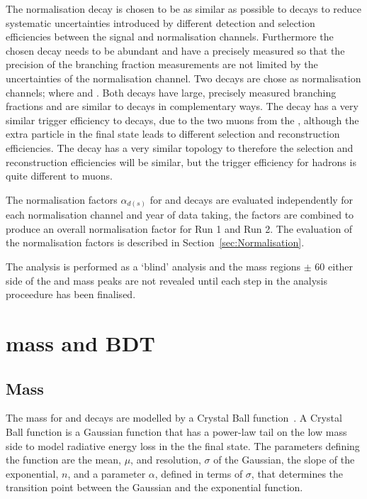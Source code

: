 The normalisation decay is chosen to be as similar as possible to \bmumu decays to reduce systematic uncertainties introduced by different detection and selection efficiencies between the signal and normalisation channels. Furthermore the chosen decay needs to be abundant and have a precisely measured \BF so that the precision of the \bmumu branching fraction measurements are not limited by the uncertainties of the normalisation channel. Two decays are chose as normalisation channels; \bujpsik where \jpsimumu and \bdkpi. Both decays have large, precisely measured branching fractions and are similar to \bmumu decays in complementary ways. The \bujpsik decay has a very similar trigger efficiency to \bmumu decays, due to the two muons from the \jpsi, although the extra particle in the final state leads to different selection and reconstruction efficiencies. The \bdkpi decay has a very similar topology to \bmumu therefore the selection and reconstruction efficiencies will be similar, but the trigger efficiency for hadrons is quite different to muons.  

The normalisation factors $\alpha_{d(s)}$ for \bdmumu and \bsmumu decays are evaluated independently for each normalisation channel and year of data taking, the factors are combined to produce an overall normalisation factor for Run 1 and Run 2. The evaluation of the normalisation factors is described in Section~\ref{sec:Normalisation}.

The analysis is performed as a `blind' analysis and the mass regions $\pm$ 60 \mevcc either side of the \bs and \bd mass peaks are not revealed until each step in the analysis proceedure has been finalised. 
\section{\bmumu mass and BDT \pdfs}
\label{sec:signalPdfs}

\subsection{Mass \pdfs}
The mass \pdfs for \bdmumu and \bsmumu decays are modelled by a Crystal Ball function~\cite{Skwarnicki:1986xj}. A Crystal Ball function is a Gaussian function that has a power-law tail on the low mass side to model radiative energy loss in the the final state. The parameters defining the function are the mean, $\mu$, and resolution, $\sigma$ of the Gaussian, the slope of the exponential, $n$, and a parameter $\alpha$, defined in terms of $\sigma$, that determines the transition point between the Gaussian and the exponential function. 

